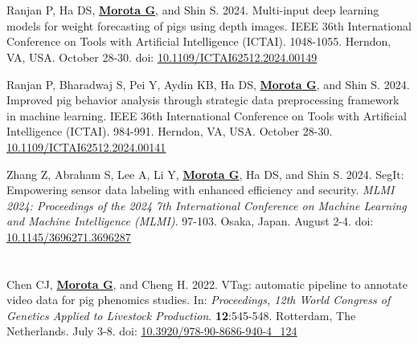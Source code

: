 \documentclass[margin,line,10pt]{res}
\newenvironment{list1}{
  \begin{list}{\ding{113}}{%
      \setlength{\itemsep}{0in}
      \setlength{\parsep}{0in} \setlength{\parskip}{0in}
      \setlength{\topsep}{0in} \setlength{\partopsep}{0in} 
      \setlength{\leftmargin}{0.17in}}}{\end{list}}
\begin{document}
\begin{resume}
\begin{list1}
\end{list1}



\section{}
\begin{list1}


  \item [{\bf 11}.] Ranjan P, Ha DS, \textbf{\underline{Morota G}}, and Shin S. 2024. Multi-input deep learning models for weight forecasting of pigs using depth images. IEEE 36th International Conference on Tools with Artificial Intelligence (ICTAI). 1048-1055. Herndon, VA, USA. October 28-30. doi: \textcolor{blue}{\href{https://doi.org/10.1109/ICTAI62512.2024.00149}{10.1109/ICTAI62512.2024.00149}}

  \vspace{0.5cm}


  \item [{\bf 10}.] Ranjan P, Bharadwaj S, Pei Y, Aydin KB, Ha DS, \textbf{\underline{Morota G}}, and Shin S. 2024. Improved pig behavior analysis through strategic data preprocessing framework in machine learning. IEEE 36th International Conference on Tools with Artificial Intelligence (ICTAI). 984-991. Herndon, VA, USA. October 28-30. \textcolor{blue}{\href{https://doi.org/10.1109/ICTAI62512.2024.00141}{10.1109/ICTAI62512.2024.00141}}


  \vspace{0.5cm}


\item [{\bf 9}.] Zhang Z, Abraham S, Lee A, Li Y, \textbf{\underline{Morota G}}, Ha DS, and Shin S. 2024. SegIt: Empowering sensor data labeling with enhanced efficiency and security. \emph{MLMI 2024: Proceedings of the 2024 7th International Conference on Machine Learning and Machine Intelligence (MLMI)}. 97-103. Osaka, Japan. August 2-4. doi: \textcolor{blue}{\href{https://doi.org/10.1145/3696271.3696287}{10.1145/3696271.3696287}}


\end{list1}




\section{}
\begin{list1}

\item [{\bf 8}.] Chen CJ, \textbf{\underline{Morota G}}, and Cheng H. 2022. VTag: automatic pipeline to annotate video data for pig phenomics studies. In: \emph{Proceedings, 12th World Congress of Genetics Applied to Livestock Production}. \textbf{12}:545-548. Rotterdam, The Netherlands. July 3-8. doi: \textcolor{blue}{\href{https://doi.org/10.3920/978-90-8686-940-4_124}{10.3920/978-90-8686-940-4\_124}}  


\end{list1}
\end{resume}
\end{document}
